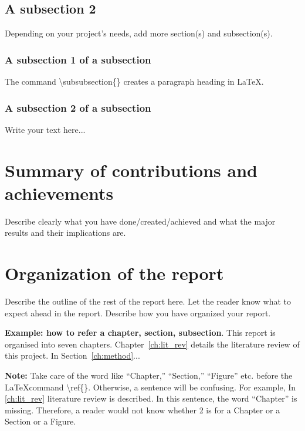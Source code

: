 \subsection{A subsection 2}
\label{sec:intro_some_sub2}
Depending on your project's needs, add more section(s) and subsection(s).

\subsubsection{A subsection 1 of a subsection}
\label{sec:intro_some_subsub1}
The command \textbackslash subsubsection\{\} creates a paragraph heading in \LaTeX.

\subsubsection{A subsection 2 of a subsection}
\label{sec:intro_some_subsub2}
Write your text here...

\section{Summary of contributions and achievements} %
\label{sec:intro_sum_results} %
Describe clearly what you have done/created/achieved and what the major results and their implications are. 


\section{Organization of the report} %
\label{sec:intro_org} %
Describe the outline of the rest of the report here. Let the reader know what to expect ahead in the report. Describe how you have organized your report. 

\textbf{Example: how to refer a chapter, section, subsection}. This report is organised into seven chapters. Chapter~\ref{ch:lit_rev} details the literature review of this project. In Section~\ref{ch:method}...  %

\textbf{Note:}  Take care of the word like ``Chapter,'' ``Section,'' ``Figure'' etc. before the \LaTeX command \textbackslash ref\{\}. Otherwise, a  sentence will be confusing. For example, In \ref{ch:lit_rev} literature review is described. In this sentence, the word ``Chapter'' is missing. Therefore, a reader would not know whether 2 is for a Chapter or a Section or a Figure.

